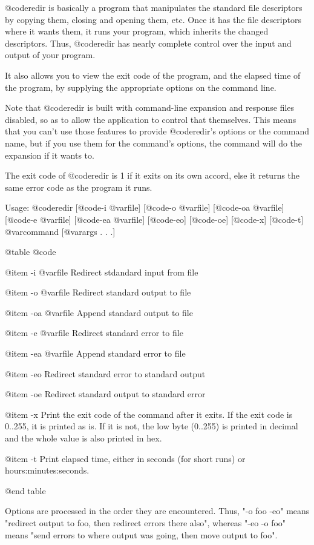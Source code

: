 @code{redir} is basically a program that manipulates the standard file
descriptors by copying them, closing and opening them, etc.  Once it
has the file descriptors where it wants them, it runs your program,
which inherits the changed descriptors.  Thus, @code{redir} has nearly
complete control over the input and output of your program.

It also allows you to view the exit code of the program, and the
elapsed time of the program, by supplying the appropriate options on
the command line.

Note that @code{redir} is built with command-line expansion and response files
disabled, so as to allow the application to control that themselves.
This means that you can't use those features to provide @code{redir}'s options
or the command name, but if you use them for the command's options, the
command will do the expansion if it wants to.

The exit code of @code{redir} is 1 if it exits on its own accord, else it
returns the same error code as the program it runs.

Usage: @code{redir} [@code{-i} @var{file}] [@code{-o} @var{file}]
[@code{-oa} @var{file}] [@code{-e} @var{file}] [@code{-ea} @var{file}]
[@code{-eo}] [@code{-oe}] [@code{-x}] [@code{-t}] @var{command}
[@var{args} . . .]

@table @code

@item -i @var{file}
Redirect stdandard input from file

@item -o @var{file}
Redirect standard output to file

@item -oa @var{file}
Append standard output to file

@item -e @var{file}
Redirect standard error to file

@item -ea @var{file}
Append standard error to file

@item -eo
Redirect standard error to standard output

@item -oe
Redirect standard output to standard error

@item -x
Print the exit code of the command after it exits.  If the exit code is
0..255, it is printed as is.  If it is not, the low byte (0..255) is
printed in decimal and the whole value is also printed in hex.

@item -t
Print elapsed time, either in seconds (for short runs) or
hours:minutes:seconds.

@end table

Options are processed in the order they are encountered.  Thus, "-o foo
-eo" means "redirect output to foo, then redirect errors there also",
whereas "-eo -o foo" means "send errors to where output was going, then
move output to foo".


